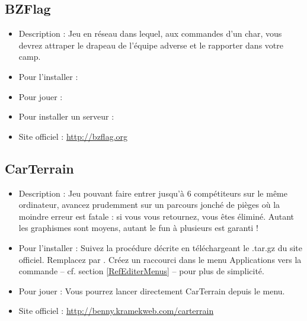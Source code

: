 \subsection{BZFlag}
\begin{itemize}
\begingroup
{}
\item Description : Jeu en réseau dans lequel, aux commandes d'un char, vous devrez attraper le drapeau de l'équipe adverse et le rapporter dans votre camp.{\par}
\endgroup
\item Pour l'installer : 
\item Pour jouer : 
\item Pour installer un serveur : 
\item Site officiel : \url{http://bzflag.org}{\par}
\end{itemize}
\subsection{CarTerrain}
\begin{itemize}
\begingroup
{}
\item Description : Jeu pouvant faire entrer jusqu'à 6 compétiteurs sur le même ordinateur, avancez prudemment sur un parcours jonché de pièges où la moindre erreur est fatale : si vous vous retournez, vous êtes éliminé. Autant les graphismes sont moyens, autant le fun à plusieurs est garanti !{\par}
\endgroup
\item Pour l'installer : Suivez la procédure décrite en téléchargeant le .tar.gz du site officiel. Remplacez  par . Créez un raccourci dans le menu Applications vers la commande  -- cf. section \ref{RefEditerMenus} -- pour plus de simplicité.{\par}
\item Pour jouer : Vous pourrez lancer directement CarTerrain depuis le menu.{\par}
\item Site officiel : \url{http://benny.kramekweb.com/carterrain}{\par}
\end{itemize}

